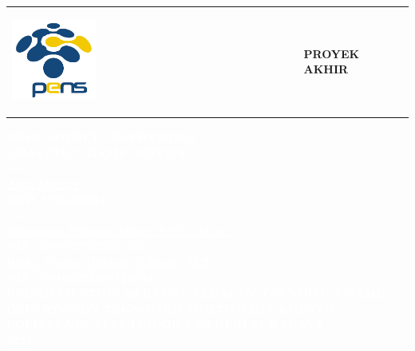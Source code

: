 \documentclass[10pt]{extarticle}
\begin{document}
\begin{table}[t]
    \centering
    \begin{tabular}{@{}m{}@{}m{}@{}}
        \begin{flushleft}
            \includegraphics[width=0.3\textwidth]{Logo_PENS.png}
            \vspace{10pt}
        \end{flushleft}
         &
        \begin{flushright}
            \textbf{PROYEK AKHIR}
            \vspace{10pt}
        \end{flushright}
    \end{tabular}
\end{table}

\begin{table}[t]
    \centering\textcolor{white}{\textbf{\fontsize{12pt}{14pt}\selectfont OPEN SOURCE ON-PREMISES\\ANALYTICS GAME SERVICE}}\\[2cm]

    \centering\textcolor{white}{\textit{Oleh:}}\\
    \centering\textcolor{white}{\textbf{\underline{Atqa Munzir}\\NRP. 5221600034}}\\[1cm]

    \centering\textcolor{white}{\textit{Dosen Pembimbing:}}\\
    \centering\textcolor{white}{\textbf{\underline{Zulhaydar Fairozal Akbar, S.ST., M.Sc.}\\NIP. 19890727202321132}}\\[10pt]
    \centering\textcolor{white}{\textbf{\underline{Rizky Yuniar Hakkun, S.Kom., M.T.}\\NIP. 198106222008121003}}\\[2cm]

    \centering\textcolor{white}{\textbf{PROGRAM STUDI SARJANA TERAPAN TEKNOLOGI GAME\\DEPARTEMEN TEKNOLOGI MULTIMEDIA KREATIF\\POLITEKNIK ELEKTRONIKA NEGERI SURABAYA}}\\[5pt]
    \centering\textcolor{white}{\textbf{2024}}
\end{table}
\end{document}
